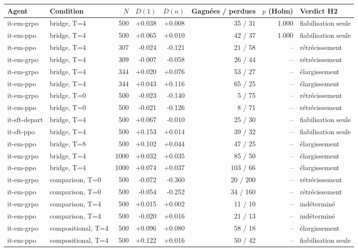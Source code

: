 \begin{tabular}{llrrrrrl}
\toprule
Agent & Condition & $N$ & $D(1)$ & $D(n)$ & Gagnées / perdues & $p$ (Holm) & Verdict H2 \\
\midrule
it-em-grpo & bridge, T=4 & 500 & +0.038 & +0.008 & 35 / 31 & 1.000 & fiabilisation seule \\
it-em-ppo & bridge, T=4 & 500 & +0.065 & +0.010 & 42 / 37 & 1.000 & fiabilisation seule \\
it-em-ppo & bridge, T=4 & 307 & -0.024 & -0.121 & 21 / 58 & -- & rétrécissement \\
it-em-grpo & bridge, T=4 & 309 & -0.007 & -0.058 & 26 / 44 & -- & rétrécissement \\
it-em-grpo & bridge, T=4 & 344 & +0.020 & +0.076 & 53 / 27 & -- & élargissement \\
it-em-ppo & bridge, T=4 & 344 & +0.043 & +0.116 & 65 / 25 & -- & élargissement \\
it-em-grpo & bridge, T=0 & 500 & -0.023 & -0.140 & 5 / 75 & -- & rétrécissement \\
it-em-ppo & bridge, T=0 & 500 & -0.021 & -0.126 & 8 / 71 & -- & rétrécissement \\
it-sft-depart & bridge, T=4 & 500 & +0.067 & -0.010 & 25 / 30 & -- & fiabilisation seule \\
it-sft-ppo & bridge, T=4 & 500 & +0.153 & +0.014 & 39 / 32 & -- & fiabilisation seule \\
it-em-ppo & bridge, T=8 & 500 & +0.102 & +0.044 & 47 / 25 & -- & élargissement \\
it-em-grpo & bridge, T=4 & 1000 & +0.032 & +0.035 & 85 / 50 & -- & élargissement \\
it-em-ppo & bridge, T=4 & 1000 & +0.074 & +0.037 & 103 / 66 & -- & élargissement \\
it-em-grpo & comparison, T=0 & 500 & -0.072 & -0.360 & 20 / 200 & -- & rétrécissement \\
it-em-ppo & comparison, T=0 & 500 & -0.054 & -0.252 & 34 / 160 & -- & rétrécissement \\
it-em-grpo & comparison, T=4 & 500 & +0.015 & +0.002 & 11 / 10 & -- & indéterminé \\
it-em-ppo & comparison, T=4 & 500 & -0.020 & +0.016 & 21 / 13 & -- & indéterminé \\
it-em-grpo & compositional, T=4 & 500 & +0.096 & +0.080 & 58 / 18 & -- & élargissement \\
it-em-ppo & compositional, T=4 & 500 & +0.122 & +0.016 & 50 / 42 & -- & fiabilisation seule \\
\bottomrule
\end{tabular}

